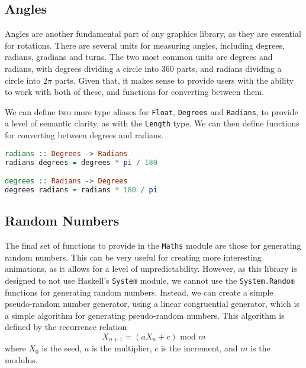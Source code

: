 \documentclass[../main.tex]{subfiles}
\begin{document}
        \subsection{Angles}
            Angles are another fundamental part of any graphics library, as they are
                essential for rotations.
            There are several units for measuring angles, including degrees, radians,
                gradians and turns.
            The two most common units are degrees and radians, with degrees dividing a
                circle into 360 parts, and radians dividing a circle into $2\pi$ parts.
            Given that, it makes sense to provide users with the ability to work with both
                of these, and functions for converting between them.

            We can define two more type aliases for \verb|Float|, \verb|Degrees| and
                \verb|Radians|, to provide a level of semantic clarity, as with the
                \verb|Length| type.
            We can then define functions for converting between degrees and radians.

            \begin{lstlisting}[language=Haskell, label={lst:angleFns}, morekeywords={Degrees, Radians},
                caption={The angle functions.}]  
radians :: Degrees -> Radians
radians degrees = degrees * pi / 180

degrees :: Radians -> Degrees
degrees radians = radians * 180 / pi
            \end{lstlisting}

        \subsection{Random Numbers}
            The final set of functions to provide in the \verb|Maths| module are those for
                generating random numbers.
            This can be very useful for creating more interesting animations, as it allows
                for a level of unpredictability.
            However, as this library is designed to not use Haskell's \verb|System| module,
                we cannot use the \verb|System.Random| functions for generating random numbers.
            Instead, we can create a simple pseudo-random number generator, using a linear
                congruential generator, which is a simple algorithm for generating
                pseudo-random numbers.
            This algorithm is defined by the recurrence relation $$X_{n+1} = (aX_n + c)
                    \text{ mod } m$$ where $X_0$ is the seed, $a$ is the multiplier, $c$ is the
                increment, and $m$ is the modulus.
\end{document}
